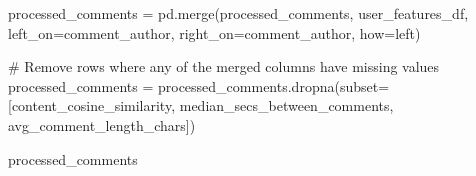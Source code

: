 \documentclass[
  12pt,
  letterpaper,
  DIV=11,
  numbers=noendperiod]{scrartcl}
\newenvironment{Shaded}{\begin{snugshade}}{\end{snugshade}}
\newcommand{\CommentTok}[1]{\textcolor[rgb]{0.37,0.37,0.37}{#1}}
\newcommand{\NormalTok}[1]{\textcolor[rgb]{0.00,0.23,0.31}{#1}}
\newcommand{\OperatorTok}[1]{\textcolor[rgb]{0.37,0.37,0.37}{#1}}
\newcommand{\StringTok}[1]{\textcolor[rgb]{0.13,0.47,0.30}{#1}}
\begin{document}
\begin{Shaded}
\begin{Highlighting}[]
\NormalTok{processed\_comments }\OperatorTok{=}\NormalTok{ pd.merge(processed\_comments, user\_features\_df, left\_on}\OperatorTok{=}\StringTok{\textquotesingle{}comment\_author\textquotesingle{}}\NormalTok{, right\_on}\OperatorTok{=}\StringTok{\textquotesingle{}comment\_author\textquotesingle{}}\NormalTok{, how}\OperatorTok{=}\StringTok{\textquotesingle{}left\textquotesingle{}}\NormalTok{)}

\CommentTok{\# Remove rows where any of the merged columns have missing values}
\NormalTok{processed\_comments }\OperatorTok{=}\NormalTok{ processed\_comments.dropna(subset}\OperatorTok{=}\NormalTok{[}\StringTok{\textquotesingle{}content\_cosine\_similarity\textquotesingle{}}\NormalTok{, }\StringTok{\textquotesingle{}median\_secs\_between\_comments\textquotesingle{}}\NormalTok{, }\StringTok{\textquotesingle{}avg\_comment\_length\_chars\textquotesingle{}}\NormalTok{])}

\NormalTok{processed\_comments}
\end{Highlighting}
\end{Shaded}
\end{document}
